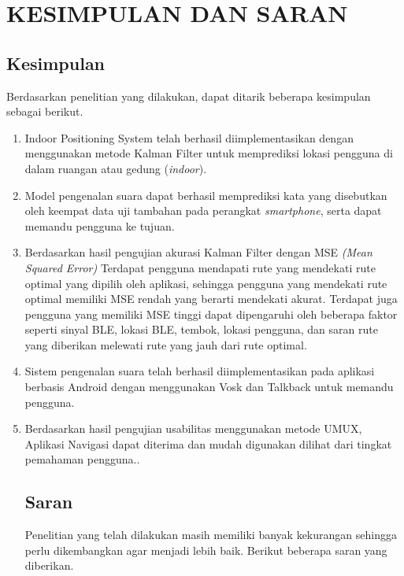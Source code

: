 \fancyhf{} 
\fancyfoot[C]{\thepage}
\chapter{KESIMPULAN DAN SARAN}

\section{Kesimpulan}
Berdasarkan penelitian yang dilakukan, dapat ditarik beberapa kesimpulan sebagai berikut.
\begin{enumerate}
	\item Indoor Positioning System telah berhasil diimplementasikan dengan menggunakan metode Kalman Filter untuk memprediksi lokasi pengguna di dalam ruangan atau gedung (\textit{indoor}).

   \item Model pengenalan suara dapat berhasil memprediksi kata yang disebutkan oleh keempat data uji tambahan pada perangkat \textit{smartphone}, serta dapat memandu pengguna ke tujuan.

   \item Berdasarkan hasil pengujian akurasi Kalman Filter dengan MSE \textit{(Mean Squared Error)} Terdapat pengguna mendapati rute yang mendekati rute optimal yang dipilih oleh aplikasi, sehingga pengguna yang mendekati rute optimal memiliki MSE rendah yang berarti mendekati akurat. Terdapat juga pengguna yang memiliki MSE tinggi dapat dipengaruhi oleh beberapa faktor seperti sinyal BLE, lokasi BLE, tembok, lokasi pengguna, dan saran rute yang diberikan melewati rute yang jauh dari rute optimal.

   \item Sistem pengenalan suara telah berhasil diimplementasikan pada aplikasi berbasis Android dengan menggunakan Vosk dan Talkback untuk memandu pengguna.

   \item Berdasarkan hasil pengujian usabilitas menggunakan metode UMUX, Aplikasi Navigasi dapat diterima dan mudah digunakan dilihat dari tingkat pemahaman pengguna..

  
\pagebreak
\section{Saran}
Penelitian yang telah dilakukan masih memiliki banyak kekurangan sehingga perlu dikembangkan agar menjadi lebih baik. Berikut beberapa saran yang diberikan.


\end{enumerate}

